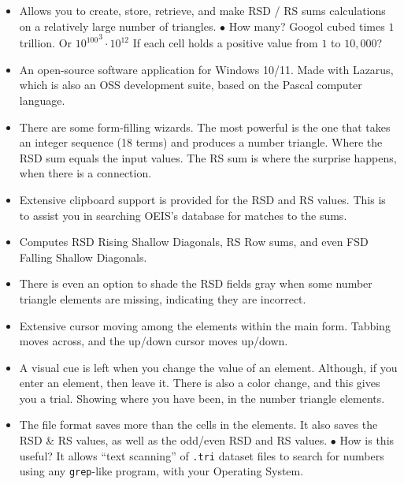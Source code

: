 \documentclass[12pt]{article}
\begin{document}
    \begin{itemize}
        \item Allows you to create, store, retrieve, and make RSD / RS sums calculations on a 
        relatively large number of triangles. $ \bullet $ How many? Googol cubed times $ 1 $ 
        trillion. Or $ {10^{100}}^3 \cdot 10^{12} $ If each cell holds a positive value from 
        $ 1 $ to $ 10,000 $?
        
        \item An open-source software application for Windows 10/11. Made with Lazarus, 
        which is also an OSS development suite, based on the Pascal computer language.
        
        \item There are some form-filling wizards. The most powerful is the one that takes an 
        integer sequence (18 terms) and produces a number triangle. Where the RSD sum equals the 
        input values. The RS sum is where the surprise happens, when there is a connection.
        
        \item Extensive clipboard support is provided for the RSD and RS values. This is to 
        assist you in searching OEIS's database for matches to the sums.
        
        \item Computes RSD Rising Shallow Diagonals, RS Row sums, and even FSD Falling Shallow 
        Diagonals.
        
        \item There is even an option to shade the RSD fields gray when some number triangle 
        elements are missing, indicating they are incorrect.
        
        \item Extensive cursor moving among the elements within the main form. Tabbing moves 
        across, and the up/down cursor moves up/down.
        
        \item A visual cue is left when you change the value of an element. Although, if you 
        enter an element, then leave it. There is also a color change, and this gives you a 
        trial. Showing where you have been, in the number triangle elements.
        
        \item The file format saves more than the cells in the elements. It also saves the RSD \& 
        RS values, as well as the odd/even RSD and RS values. $ \bullet $ How is this useful? It 
        allows ``text scanning'' of \verb+.tri+ dataset files to search for numbers using any 
        \verb+grep+-like program, with your Operating System.
    \end{itemize}
\end{document}
